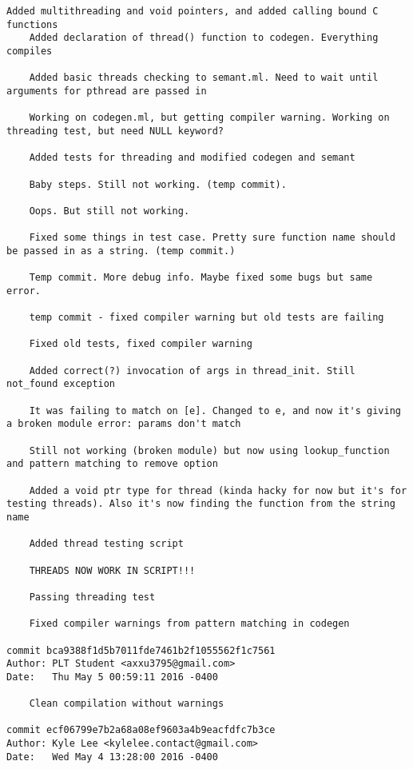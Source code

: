 \begin{lstlisting}[backgroundcolor=\color{white}]
    Added multithreading and void pointers, and added calling bound C functions
    Added declaration of thread() function to codegen. Everything compiles
    
    Added basic threads checking to semant.ml. Need to wait until arguments for pthread are passed in
    
    Working on codegen.ml, but getting compiler warning. Working on threading test, but need NULL keyword?
    
    Added tests for threading and modified codegen and semant
    
    Baby steps. Still not working. (temp commit).
    
    Oops. But still not working.
    
    Fixed some things in test case. Pretty sure function name should be passed in as a string. (temp commit.)
    
    Temp commit. More debug info. Maybe fixed some bugs but same error.
    
    temp commit - fixed compiler warning but old tests are failing
    
    Fixed old tests, fixed compiler warning
    
    Added correct(?) invocation of args in thread_init. Still not_found exception
    
    It was failing to match on [e]. Changed to e, and now it's giving a broken module error: params don't match
    
    Still not working (broken module) but now using lookup_function and pattern matching to remove option
    
    Added a void ptr type for thread (kinda hacky for now but it's for testing threads). Also it's now finding the function from the string name
    
    Added thread testing script
    
    THREADS NOW WORK IN SCRIPT!!!
    
    Passing threading test
    
    Fixed compiler warnings from pattern matching in codegen

commit bca9388f1d5b7011fde7461b2f1055562f1c7561
Author: PLT Student <axxu3795@gmail.com>
Date:   Thu May 5 00:59:11 2016 -0400

    Clean compilation without warnings

commit ecf06799e7b2a68a08ef9603a4b9eacfdfc7b3ce
Author: Kyle Lee <kylelee.contact@gmail.com>
Date:   Wed May 4 13:28:00 2016 -0400


\end{lstlisting}
